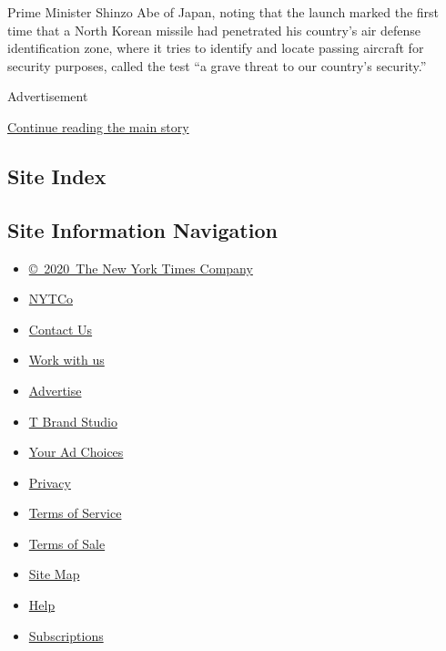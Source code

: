 Prime Minister Shinzo Abe of Japan, noting that the launch marked the
first time that a North Korean missile had penetrated his country's air
defense identification zone, where it tries to identify and locate
passing aircraft for security purposes, called the test ``a grave threat
to our country's security.''

Advertisement

\protect\hyperlink{after-bottom}{Continue reading the main story}

\hypertarget{site-index}{%
\subsection{Site Index}\label{site-index}}

\hypertarget{site-information-navigation}{%
\subsection{Site Information
Navigation}\label{site-information-navigation}}

\begin{itemize}
\tightlist
\item
  \href{https://help.nytimes.com/hc/en-us/articles/115014792127-Copyright-notice}{©~2020~The
  New York Times Company}
\end{itemize}

\begin{itemize}
\tightlist
\item
  \href{https://www.nytco.com/}{NYTCo}
\item
  \href{https://help.nytimes.com/hc/en-us/articles/115015385887-Contact-Us}{Contact
  Us}
\item
  \href{https://www.nytco.com/careers/}{Work with us}
\item
  \href{https://nytmediakit.com/}{Advertise}
\item
  \href{http://www.tbrandstudio.com/}{T Brand Studio}
\item
  \href{https://www.nytimes.com/privacy/cookie-policy\#how-do-i-manage-trackers}{Your
  Ad Choices}
\item
  \href{https://www.nytimes.com/privacy}{Privacy}
\item
  \href{https://help.nytimes.com/hc/en-us/articles/115014893428-Terms-of-service}{Terms
  of Service}
\item
  \href{https://help.nytimes.com/hc/en-us/articles/115014893968-Terms-of-sale}{Terms
  of Sale}
\item
  \href{https://spiderbites.nytimes.com}{Site Map}
\item
  \href{https://help.nytimes.com/hc/en-us}{Help}
\item
  \href{https://www.nytimes.com/subscription?campaignId=37WXW}{Subscriptions}
\end{itemize}
